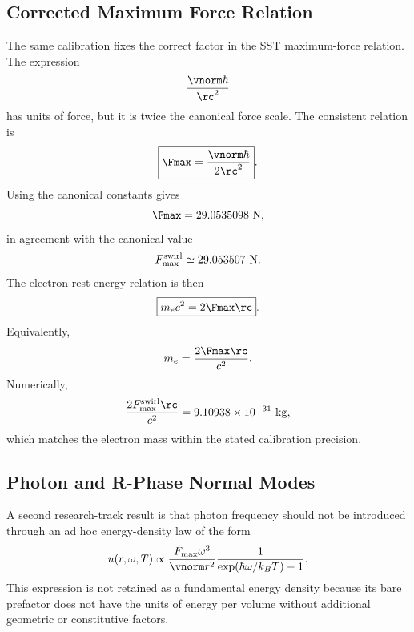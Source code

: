 \subsection{Corrected Maximum Force Relation}
    
    The same calibration fixes the correct factor in the SST maximum-force
    relation.  The expression
    \begin{equation}
        \frac{\vnorm\hbar}{\rc^2}
    \end{equation}
    has units of force, but it is twice the canonical force scale.  The
    consistent relation is
    \begin{equation}
        \boxed{
            \Fmax
            =
            \frac{\vnorm\hbar}{2\rc^2}
        } .
        \label{eq:Fmax_corrected}
    \end{equation}
    Using the canonical constants gives
    \begin{equation}
        \Fmax
        =
        29.0535098\ {\rm N},
    \end{equation}
    in agreement with the canonical value
    \begin{equation}
        F_{\max}^{\rm swirl}
        \simeq
        29.053507\ {\rm N}.
    \end{equation}
    The electron rest energy relation is then
    \begin{equation}
        \boxed{
            m_ec^2
            =
            2\Fmax \rc
        } .
        \label{eq:electron_energy_force_core}
    \end{equation}
    Equivalently,
    \begin{equation}
        m_e
        =
        \frac{2\Fmax\rc}{c^2}.
    \end{equation}
    Numerically,
    \begin{equation}
        \frac{2F_{\max}^{\rm swirl}\rc}{c^2}
        =
        9.10938\times10^{-31}\ {\rm kg},
    \end{equation}
    which matches the electron mass within the stated calibration precision.

\subsection{Photon and R-Phase Normal Modes}
    
    A second research-track result is that photon frequency should not be
    introduced through an ad hoc energy-density law of the form
    \begin{equation}
        u(r,\omega,T)
        \propto
        \frac{F_{\max}\omega^3}{\vnorm r^2}
        \frac{1}{\exp(\hbar\omega/k_BT)-1}.
        \label{eq:rejected_photon_density}
    \end{equation}
    This expression is not retained as a fundamental energy density because
    its bare prefactor does not have the units of energy per volume without
    additional geometric or constitutive factors.
    

